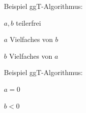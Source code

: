\vspace{1mm} %

Beispiel ggT-Algorithmus:

\begin{addmargin}[25pt]{25pt}
	$a,b$ teilerfrei
	
	$a$ Vielfaches von $b$
	
	$b$ Vielfaches von $a$
\end{addmargin}

\vspace{2mm} %


Beispiel ggT-Algorithmus:

\begin{addmargin}[25pt]{25pt}
	$a= 0$
	
	$b<0$
\end{addmargin}
